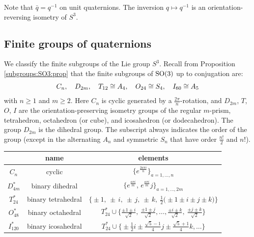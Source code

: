 Note that $\bar q = q^{-1}$ on unit quaternions.
The inversion $q \mapsto q^{-1}$ is an orientation-reversing isometry of $S^3$. 

\subsection{Finite groups of quaternions}
We classify the finite subgroups of the Lie group $S^3$. Recall from Proposition \ref{subgroups:SO3:prop} that the finite subgroups of ${\rm SO}(3)$ up to conjugation are:
$$C_n, \quad D_{2m}, \quad T_{12} \cong A_4, \quad O_{24} \cong S_4, \quad I_{60} \cong A_5$$
with $n\geqslant 1$ and $m\geqslant 2$. Here $C_n$ is cyclic generated by a $\frac{2\pi}n$-rotation, and $D_{2m}$, $T$, $O$, $I$ are the orientation-preserving isometry groups of the regular $m$-prism, tetrahedron, octahedron (or cube), and icosahedron (or dodecahedron). The group $D_{2m}$ is the dihedral group. The subscript always indicates the order of the group (except in the alternating $A_n$ and symmetric $S_n$ that have order $\frac{n!}2$ and $n!$).

\begin{table}
\begin{center}
\begin{tabular}{c||cc}
\phantom{\Big|} \!\! & name        & elements \\
 \hline \hline
\phantom{\Big|} \!\!  $C_n$ & cyclic & $\big\{e^{\frac{2a\pi i}n}\big\}_{a=1,\ldots, n}$ \\
\phantom{\Big|} \!\!  $D_{4m}^*$ & binary dihedral & $\big\{e^{\frac{a\pi i}m}$, $e^{\frac{a\pi i}m}j\big\}_{a=1,\ldots, 2m}$  \\
\phantom{\Big|} \!\!  $T_{24}^*$ & binary tetrahedral & $\big\{\pm 1 ,\ \pm\, i,\ \pm\, j,\ \pm\, k,\ \frac 12 \big(\!\pm 1 \pm i \pm j \pm k\big)\big\}$ \\
\phantom{\Big|} \!\!  $O_{48}^*$ & binary octahedral & 
$T_{24}^* \cup \big\{\frac {\pm 1 \pm i}{\sqrt 2},\ \frac {\pm 1 \pm j}{\sqrt 2}, \ldots, \frac {\pm i \pm k}{\sqrt 2},\ \frac {\pm j \pm k}{\sqrt 2} \big\}$ \\
\phantom{\Big|}  \!\!  $I_{120}^*$ & binary icosahedral &
$T_{24}^* \cup \big\{\pm \frac 1 2i \pm \frac{\sqrt 5 -1}4 j \pm \frac{\sqrt 5 + 1}4 k, \ldots \big\} $ \\
\end{tabular}
\vspace{.2 cm}
\label{binary:table}
\end{center}
\end{table}

